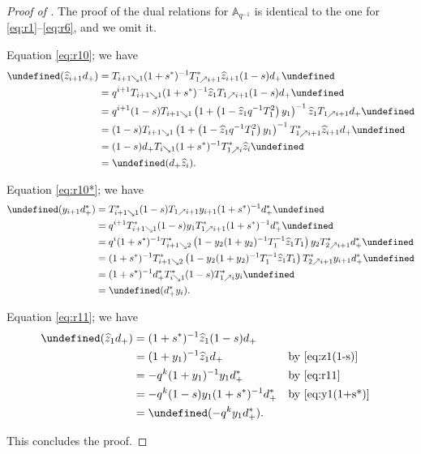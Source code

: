 \documentclass[reqno]{amsart}
\theoremstyle{plain}
\theoremstyle{definition}
\theoremstyle{remark}
\newcommand{\A}{\mathbb{A}}%
\newcommand{\z}{\widehat{z}}
\let\oldTheta\Theta
\let\Theta\undefined
\DeclareMathOperator{\Theta}{\oldTheta}
\newcommand{\<}{\langle}
\renewcommand{\>}{\rangle}
\begin{document}
\begin{proof}[Proof of {}]
    The proof of the dual relations for $\A_{q^{-1}}$ is identical to the one for \eqref{eq:r1}--\eqref{eq:r6}, and we omit it.

    Equation \eqref{eq:r10}; we have
    \begin{align*}
        \Theta(\z_{i+1} d_+) &= T_{i+1 \searrow 1} (1+s^*)^{-1} T_{1 \nearrow i+1}^* \z_{i+1} (1-s) d_+ \Theta \\
        &= q^{i+1} T_{i+1 \searrow 1} (1+s^*)^{-1} \z_1 T_{1 \nearrow i+1}  (1-s) d_+ \Theta \\
        &= q^{i+1} (1-s) T_{i+1 \searrow 1} \left( 1 + \left( 1 - \z_1 q^{-1} T^2_1 \right) y_1 \right)^{-1} \z_1 T_{1 \nearrow i+1} d_+ \Theta \\
        &= (1-s) T_{i+1 \searrow 1} \left( 1 + \left( 1 - \z_1 q^{-1} T^2_1 \right) y_1 \right)^{-1}  T_{1 \nearrow i+1}^* \z_{i+1} d_+ \Theta \\
        &= (1-s) d_+ T_{i \searrow 1} (1+s^*)^{-1} T_{1 \nearrow i}^* \z_i \Theta \\
        &= \Theta(d_+ \z_i).
    \end{align*}
    
    Equation \eqref{eq:r10*}; we have
    \begin{align*}
        \Theta(y_{i+1} d^*_+) &= T_{i+1 \searrow 1}^* (1-s) T_{1 \nearrow i+1} y_{i+1} (1+s^*)^{-1} d^*_+ \Theta \\
        &= q^{i+1} T_{i+1 \searrow 1}^* (1-s) y_1 T_{1 \nearrow i+1}^* (1+s^*)^{-1} d^*_+ \Theta \\
        &= q^i (1+s^*)^{-1} T^*_{i+1 \searrow 2} \left( 1 - y_2 (1 + y_2)^{-1} T_1^{-1} \z_1 T_1 \right) y_2 T^*_{2 \nearrow i+1} d^*_+ \Theta \\
        &= (1+s^*)^{-1} T^*_{i+1 \searrow 2} \left( 1 - y_2 (1 + y_2)^{-1} T_1^{-1} \z_1 T_1 \right) T^*_{2 \nearrow i+1} y_{i+1} d^*_+ \Theta \\
        &= (1+s^*)^{-1} d^*_+ T^*_{i \searrow 1} (1-s) T^*_{1 \nearrow i} y_{i}\Theta \\
        &= \Theta(d^*_+ y_i).
    \end{align*}

    Equation \eqref{eq:r11}; we have
    \begin{align*}
        \Theta(\z_1 d_+) & = (1+s^*)^{-1} \z_1 (1-s) d_+ \\
        & = (1 + y_1)^{-1} \z_1 d_+ && \text{by } \eqref{eq:z1(1-s)} \\
        & = -q^k (1 + y_1)^{-1} y_1 d_+^* && \text{by } \eqref{eq:r11} \\
        & = -q^k (1-s) y_1 (1+s^*)^{-1} d_+^* && \text{by } \eqref{eq:y1(1+s*)} \\
        & = \Theta(-q^k y_1 d_+^*).
    \end{align*}

    This concludes the proof.
\end{proof}
\end{document}
